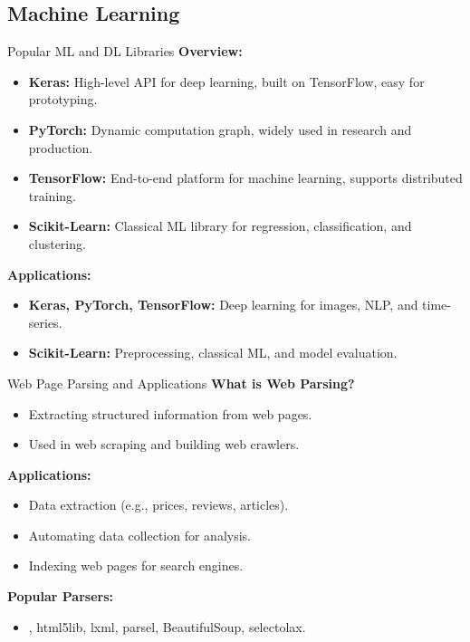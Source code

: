 \documentclass[10pt]{beamer}
\let\olditem\item
\renewcommand\item{\olditem\justifying}
\begin{document}
	\subsection{Machine Learning}
	\begin{frame}{Popular ML and DL Libraries}
		\textbf{Overview:}
		\begin{itemize}
			\item \textbf{Keras:} High-level API for deep learning, built on TensorFlow, easy for prototyping.
			\item \textbf{PyTorch:} Dynamic computation graph, widely used in research and production.
			\item \textbf{TensorFlow:} End-to-end platform for machine learning, supports distributed training.
			\item \textbf{Scikit-Learn:} Classical ML library for regression, classification, and clustering.
		\end{itemize}
		
		\textbf{Applications:}
		\begin{itemize}
			\item \textbf{Keras, PyTorch, TensorFlow:} Deep learning for images, NLP, and time-series.
			\item \textbf{Scikit-Learn:} Preprocessing, classical ML, and model evaluation.
		\end{itemize}
	\end{frame}
	
	
	
	\begin{frame}{Web Page Parsing and Applications}
		\textbf{What is Web Parsing?}
		\begin{itemize}
			\item Extracting structured information from web pages.
			\item Used in web scraping and building web crawlers.
		\end{itemize}
		
		\textbf{Applications:}
		\begin{itemize}
			\item Data extraction (e.g., prices, reviews, articles).
			\item Automating data collection for analysis.
			\item Indexing web pages for search engines.
		\end{itemize}
		
		\textbf{Popular Parsers:}
		\begin{itemize}
			\item {html.parser}, {html5lib}, {lxml}, {parsel}, {BeautifulSoup}, {selectolax}.
		\end{itemize}
	\end{frame}
	
\end{document}
